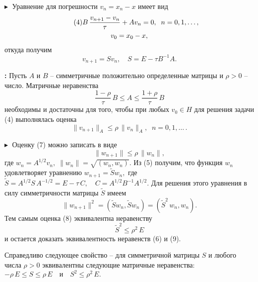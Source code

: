 $\blacktriangleright\;$ Уравнение для погрешности $v_n = x_n - x$ имеет вид 
\begin{gather}
    \tag{4}
    B\, \frac{v_{n+1} - v_{n}}{\tau} + A v_n = 0, \;\; n = 0, 1, \ldots,\\
    \notag
    v_0 = x_0 - x,
\end{gather}
откуда получим 
\begin{equation}\tag{5}
    v_{n+1} = S v_n, \quad S = E - \tau B^{-1} A.
\end{equation}

\textbf{:\;} Пусть $A$ и $B$ -- симметричные положительно определенные матрицы и $\rho >0$ -- число. Матричные неравенства 
\begin{equation}\tag{6}
    \frac{1-\rho}{\tau} \, B \leq A \leq \frac{1+\rho}{\tau} \, B
\end{equation}
необходимы и достаточны для того, чтобы при любых $v_0 \in H$ для решения задачи (4) выполнялась оценка 
\begin{equation} \tag{7}
    \|v_{n+1}\|_A \leq \rho \,\|v_n\|_A, \;\; n = 0, 1, \ldots\, .
\end{equation}

$\blacktriangleright\;$ Оценку (7) можно записать в виде 
\begin{equation}\tag{8}
    \|w_{n+1}\| \leq \rho\,\|w_n\|,
\end{equation}
где $w_n = A^{1/2} v_n,\; \|w_n\| = \sqrt{(w_n, w_n)}$. Из (5) получим, что функция $w_n$ удовлетворяет уравнению 
$
w_{n+1} = \widetilde{S} w_n,
$ 
где $\widetilde{S} = A^{1/2}S\,A^{-1/2} = E - \tau\,C, \quad C = A^{1/2}B^{-1}A^{1/2}$. Для решения этого уравнения в силу симметричности матрицы $\widetilde{S}$ имеем 
$$
\|w_{n+1}\|^2 = (\widetilde{S} w_n, \widetilde{S} w_n) = (\widetilde{S}^2\,w_n, w_n).
$$
Тем самым оценка (8) эквивалентна неравенству 
\begin{equation}
    \tag{9}
    \widetilde{S}^2 \leq \rho^2 \,E
\end{equation}
и остается доказать эквивалентность неравенств (6) и (9).

Справедливо следующее свойство -- для симметричной матрицы $S$ и любого числа $\rho >0$ эквивалентны следующие матричные неравенства: 
$
-\rho\, E \leq S \leq \rho\,E \quad \textit{и}  \quad S^2 \leq \rho^2\,E.
$


